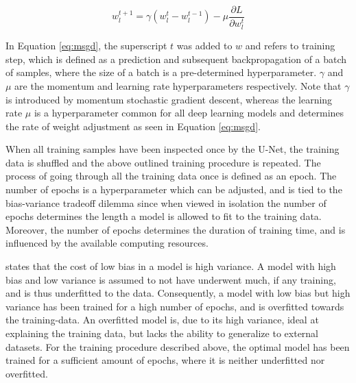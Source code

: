 \documentclass[../main/thesis.tex]{subfiles}
\begin{document}
\begin{equation}
    \label{eq:msgd}
    w_l^{t+1} = \gamma(w_l^t - w_l^{t-1}) - \mu\frac{\partial L}{\partial w_l^t}
\end{equation}

In Equation \ref{eq:msgd}, the superscript $t$ was added to $w$ and refers to training step, which is defined as a prediction and subsequent backpropagation of a batch of samples, where the size of a batch is a pre-determined hyperparameter. $\gamma$ and $\mu$ are the momentum and learning rate hyperparameters respectively. Note that $\gamma$ is introduced by momentum stochastic gradient descent, whereas the learning rate $\mu$ is a hyperparameter common for all deep learning models and determines the rate of weight adjustment as seen in Equation \ref{eq:msgd}.

When all training samples have been inspected once by the U-Net, the training data is shuffled and the above outlined training procedure is repeated. The process of going through all the training data once is defined as an epoch. The number of epochs is a hyperparameter which can be adjusted, and is tied to the bias-variance tradeoff dilemma \citep{Geman1992} since when viewed in isolation the number of epochs determines the length a model is allowed to fit to the training data. Moreover, the number of epochs determines the duration of training time, and is influenced by the available computing resources.

\citet{Geman1992} states that the cost of low bias in a model is high variance. A model with high bias and low variance is assumed to not have underwent much, if any training, and is thus underfitted to the data. Consequently, a model with low bias but high variance has been trained for a high number of epochs, and is overfitted towards the training-data. An overfitted model is, due to its high variance, ideal at explaining the training data, but lacks the ability to generalize to external datasets. For the training procedure described above, the optimal model has been trained for a sufficient amount of epochs, where it is neither underfitted nor overfitted.
\end{document}
